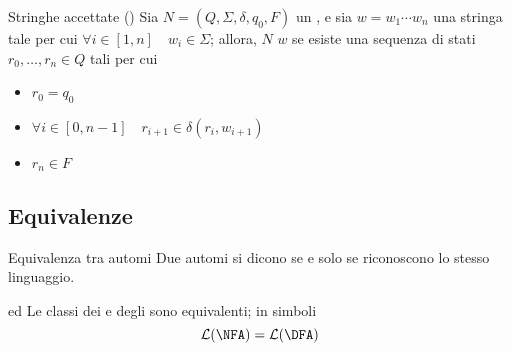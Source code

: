 \documentclass[a4paper, 12pt]{report}
\begin{document}
    \begin{frameddefn}{Stringhe accettate (\NFA)}
        Sia $N = (Q, \Sigma, \delta, q_0, F)$ un \NFA, e sia $w = w_1\cdots w_n$ una stringa tale per cui $\forall i \in [1, n] \quad w_i \in \Sigma$; allora, $N$  $w$ se esiste una sequenza di stati $r_0, \ldots, r_n \in Q$ tali per cui

        \begin{itemize}
            \item $r_0 = q_0$
            \item $\forall i \in [0, n - 1] \quad r_{i + 1} \in \delta(r_i, w_{i + 1})$
            \item $r_n \in F$
        \end{itemize}
    \end{frameddefn}

    \subsection{Equivalenze}

    \begin{frameddefn}{Equivalenza tra automi}
        Due automi si dicono  se e solo se riconoscono lo stesso linguaggio.
    \end{frameddefn}

    \begin{framedthm}[label={nfa equiv}]{\DFA ed \NFA}
        Le classi dei \DFA e degli \NFA sono equivalenti; in simboli $$\mathcal{L}(\mathrm{\NFA}) = \mathcal{L}(\mathrm{\DFA})$$
    \end{framedthm}
\end{document}
